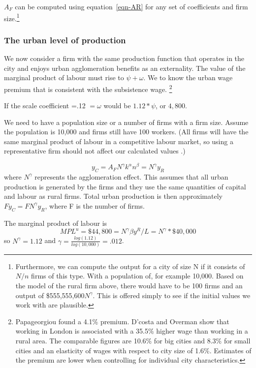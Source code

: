 %
$A_F$ can be computed using equation~\ref{eqn-AR} for any set of coefficients and firm size.\footnote{Furthermore, we can compute the output for a city of size N if it consists of $N/n$ firms of this type. With a population of, for example 10,000. Based on the model of the rural firm above,   there would have to be  100 firms and an output of \$555,555,600$N^\gamma$. This is offered simply to see if the initial values we work with are plausible.}



 \subsubsection{The urban level of production}
We now consider a firm with the same production function that operates in the city and enjoys  urban agglomeration benefits as an externality. The value of the  marginal product of labour must rise to $\psi+\omega$. We to know  the urban wage premium that is consistent with the subsistence wage. \footnote{Papageorgiou \cite{papageorgiouOccupationalMatchingCities2022} found a 4.1\% premium. D'costa and Overman   show that working in London is associated with a 35.5\% higher wage than working in a rural area. The comparable figures are 10.6\% for big cities and 8.3\% for small cities and an elasticity of wages with respect to city size of 1.6\%. Estimates of the premium are lower  when controlling for individual city characteristics.}   

If the scale coefficient =.12 $=\omega$ would be $1.12*\psi$, or $4,800$.

We need to have a population size or a number of firms with a firm size. Assume the population is 10,000 and firms still have 100 workers. (All firms will have the same marginal product of labour in a competitive labour market, so using a representative firm should not affect our calculated values .)

\[y_C=A_F N^\gamma k^\alpha n^\beta = N^\gamma y_R\]
where $N^\gamma$ represents the agglomeration effect. This assumes that all urban production is generated by the firms and they use the same quantities of capital and labour as rural firms. Total urban production is then approximately $Fy_C=FN^\gamma y_R $, where F is the number of firms.

The marginal product of labour is 
\[MPL^u=\$44,800=N^\gamma \beta y^R/L=N^\gamma *\$40,000\]
so $N^\gamma= 1.12$ and $\gamma = \frac{log(1.12)}{log(10,000)} =.012$. 



